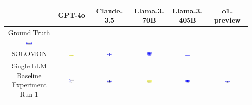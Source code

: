 \begin{table}[H]
    \centering
    \begin{tabular}{|c|c|c|c|c|c|}
    \hline
    & GPT-4o & Claude-3.5 & Llama-3-70B & Llama-3-405B & o1-preview \\
    \hline
    Ground Truth {\includegraphics[width=0.15\textwidth]{examples_png/DLDChip.png}} & & & & &  \\
    \hline
    SOLOMON & \includegraphics[width=0.15\textwidth]{./pool_all/png/gpt-4o_results/DLDChip.png} & \includegraphics[width=0.15\textwidth]{./pool_all/png/claude-3-5-sonnet-20240620_results/DLDChip.png} & \includegraphics[width=0.15\textwidth]{./pool_all/png/watsonx_meta-llama_llama-3-1-70b-instruct_results/DLDChip.png} & \includegraphics[width=0.15\textwidth]{./pool_all/png/watsonx_meta-llama_llama-3-405b-instruct_results/DLDChip.png} & \\
    \hline
    Single LLM Baseline Experiment Run 1 & \includegraphics[width=0.15\textwidth]{./run_1/png/gpt-4o_results/DLDChip.png} & \includegraphics[width=0.15\textwidth]{./run_1/png/claude-3-5-sonnet-20240620_results/DLDChip.png} & \includegraphics[width=0.15\textwidth]{./run_1/png/watsonx_meta-llama_llama-3-1-70b-instruct_results/DLDChip.png} & \includegraphics[width=0.15\textwidth]{./run_1/png/watsonx_meta-llama_llama-3-405b-instruct_results/DLDChip.png} & \includegraphics[width=0.15\textwidth]{./run_1/png/o1-preview_results/DLDChip.png} \\

\end{tabular}
\end{table}

